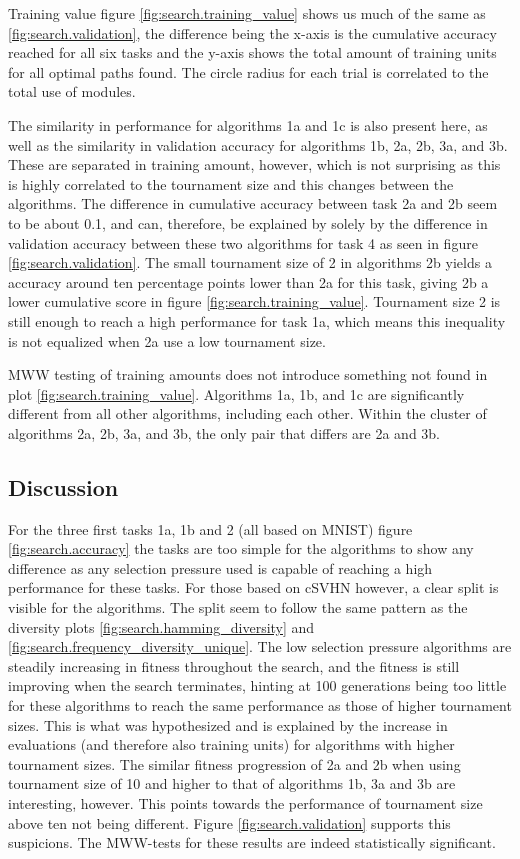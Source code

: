 Training value figure \ref{fig:search.training_value} shows us much of the same as \ref{fig:search.validation}, the difference being the x-axis is the cumulative accuracy reached for all six tasks and the y-axis shows the total amount of training units for all optimal paths found. The circle radius for each trial is correlated to the total use of modules. 

The similarity in performance for algorithms 1a and 1c is also present here, as well as the similarity in validation accuracy for algorithms 1b, 2a, 2b, 3a, and 3b. These are separated in training amount, however, which is not surprising as this is highly correlated to the tournament size and this changes between the algorithms. The difference in cumulative accuracy between task 2a and 2b seem to be about 0.1, and can, therefore, be explained by solely by the difference in validation accuracy between these two algorithms for task 4 as seen in figure \ref{fig:search.validation}. The small tournament size of 2 in algorithms 2b yields a accuracy around ten percentage points lower than 2a for this task, giving 2b a lower cumulative score in figure \ref{fig:search.training_value}. Tournament size 2 is still enough to reach a high performance for task 1a, which means this inequality is not equalized when 2a use a low tournament size. 

MWW testing of training amounts does not introduce something not found in plot \ref{fig:search.training_value}. Algorithms 1a, 1b, and 1c are significantly different from all other algorithms, including each other. Within the cluster of algorithms 2a, 2b, 3a, and 3b, the only pair that differs are 2a and 3b. 

\subsection{Discussion}
For the three first tasks 1a, 1b and 2 (all based on MNIST) figure \ref{fig:search.accuracy} the tasks are too simple for the algorithms to show any difference as any selection pressure used is capable of reaching a high performance for these tasks. For those based on cSVHN however, a clear split is visible for the algorithms. The split seem to follow the same pattern as the diversity plots \ref{fig:search.hamming_diversity} and \ref{fig:search.frequency_diversity_unique}. The low selection pressure algorithms are steadily increasing in fitness throughout the search, and the fitness is still improving when the search terminates, hinting at 100 generations being too little for these algorithms to reach the same performance as those of higher tournament sizes. This is what was hypothesized and is explained by the increase in evaluations (and therefore also training units) for algorithms with higher tournament sizes. The similar fitness progression of 2a and 2b when using tournament size of 10 and higher to that of algorithms 1b, 3a and 3b are interesting, however. This points towards the performance of tournament size above ten not being different. Figure \ref{fig:search.validation} supports this suspicions. The MWW-tests for these results are indeed statistically significant.

